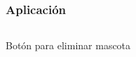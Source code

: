 \documentclass[14pt]{beamer}
\begin{document}
\begin{frame}
\frametitle{Aplicación}


\begin{columns}
\begin{column}{0.3\textwidth}
\begin{center}

\begin{small}
\caption{Botón para eliminar mascota}
\end{small}
\end{center}
\end{column}


\begin{column}{0.3\textwidth}
\begin{center}


\end{center}
\end{column}
\end{columns}
\end{frame}
\end{document}
